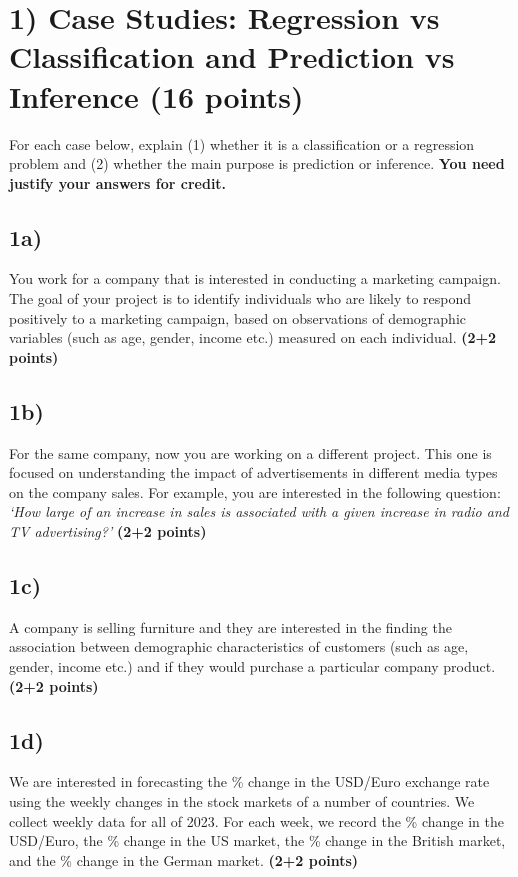 \documentclass[
  letterpaper,
  DIV=11,
  numbers=noendperiod]{scrreprt}
\begin{document}
\section{1) Case Studies: Regression vs Classification and Prediction vs
Inference (16
points)}\label{case-studies-regression-vs-classification-and-prediction-vs-inference-16-points}

For each case below, explain (1) whether it is a classification or a
regression problem and (2) whether the main purpose is prediction or
inference. \textbf{You need justify your answers for credit.}

\subsection{1a)}\label{a}

You work for a company that is interested in conducting a marketing
campaign. The goal of your project is to identify individuals who are
likely to respond positively to a marketing campaign, based on
observations of demographic variables (such as age, gender, income etc.)
measured on each individual. \textbf{(2+2 points)}

\subsection{1b)}\label{b}

For the same company, now you are working on a different project. This
one is focused on understanding the impact of advertisements in
different media types on the company sales. For example, you are
interested in the following question: \emph{`How large of an increase in
sales is associated with a given increase in radio and TV advertising?'}
\textbf{(2+2 points)}

\subsection{1c)}\label{c}

A company is selling furniture and they are interested in the finding
the association between demographic characteristics of customers (such
as age, gender, income etc.) and if they would purchase a particular
company product. \textbf{(2+2 points)}

\subsection{1d)}\label{d}

We are interested in forecasting the \% change in the USD/Euro exchange
rate using the weekly changes in the stock markets of a number of
countries. We collect weekly data for all of 2023. For each week, we
record the \% change in the USD/Euro, the \% change in the US market,
the \% change in the British market, and the \% change in the German
market. \textbf{(2+2 points)}
\end{document}
